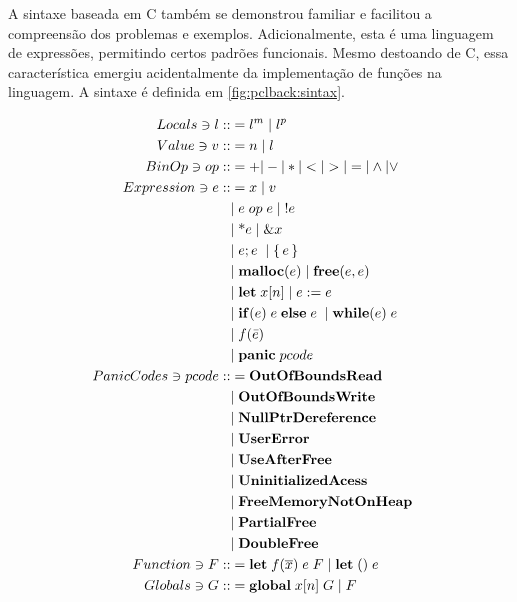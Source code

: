 A sintaxe baseada em C também se demonstrou familiar e facilitou a compreensão dos problemas e exemplos. Adicionalmente, esta é uma linguagem de expressões, permitindo certos padrões funcionais. Mesmo destoando de C, essa característica emergiu acidentalmente da implementação de funções na linguagem. A  sintaxe é definida em \ref{fig:pclback:sintax}.
\begin{figure*}[ht]
	\begingroup
		\begin{align*}
			Locals \ni l ::&= l^m \;|\; l^p &&\\ 
			Value \ni v ::&= n \;|\; l && \\
			BinOp \ni op ::&= + | - | * | < | > | = | \land | \lor \\
			Expression \ni e ::&= x \;|\; v \\
			&|\; e\; op\; e \;|\; !e  \\
			&|\; \text{*}e \;|\; \&x \\
			&|\; e;e \; \;|\; \{\,e\,\} \; \\ 
			&|\; \mathbf{malloc}(e) \;|\; \mathbf{free}(e, e) \; \\ 
			&|\; \mathbf{let}\; x[n] \;|\; e := e \; \\
			&|\; \mathbf{if}(e) \; e \; \mathbf{else} \; e \; \;|\; \mathbf{while}(e) \; e \\
			&|\; f(\bar e) \\ 
			&|\; \mathbf{panic}\;pcode \\ 
			PanicCodes \ni pcode ::&= \mathbf{OutOfBoundsRead}\\
			&|\; \mathbf{OutOfBoundsWrite}\\
			&|\; \mathbf{NullPtrDereference}\\
			&|\; \mathbf{UserError}\\
			&|\; \mathbf{UseAfterFree}\\
			&|\; \mathbf{UninitializedAcess}\\
			&|\; \mathbf{FreeMemoryNotOnHeap}\\
			&|\; \mathbf{PartialFree}\\
			&|\; \mathbf{DoubleFree}\\
			Function \ni F ::&= \mathbf{let} \; f(\overline{x})\; e \; F \; | \; \mathbf{let}\;() \; e \\
			Globals \ni G ::&= \mathbf{global}\; x[n] \;G \;|\; F
		\end{align*}
	\endgroup
	\caption{Sintaxe de $PCL_{back}$}
	\label{fig:pclback:sintax}
\end{figure*}
\FloatBarrier


